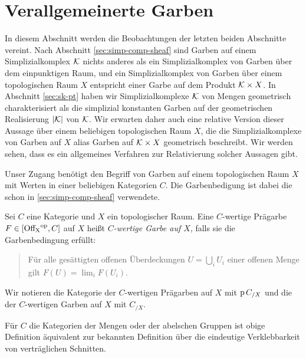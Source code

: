
\section{Verallgemeinerte Garben}
\label{sec:gen-sheaves}

In diesem Abschnitt werden die Beobachtungen der letzten beiden
Abschnitte vereint. Nach Abschnitt \autoref{sec:simp-comp-sheaf} sind
Garben auf einem Simplizialkomplex $\mathcal{K}$ nichts anderes als ein
Simplizialkomplex von Garben über dem einpunktigen Raum, und ein
Simplizialkomplex von Garben über einem topologischen Raum $X$
entspricht einer Garbe auf dem Produkt $\mathcal{K} \times X$. In Abschnitt
\autoref{sec:sk-pt} haben wir Simplizialkomplexe $\mathcal{K}$ von Mengen
geometrisch charakterisiert als die simplizial konstanten Garben auf
der geometrischen Realisierung $|\mathcal{K}|$ von $\mathcal{K}$. Wir erwarten daher
auch eine relative Version dieser Aussage über einem beliebigen
topologischen Raum $X$, die die Simplizialkomplexe von Garben auf $X$
alias Garben auf $\mathcal{K} \times X$ geometrisch beschreibt. Wir werden
sehen, dass es ein allgemeines Verfahren zur Relativierung solcher
Aussagen gibt.

Unser Zugang benötigt den Begriff von Garben auf einem topologischen
Raum $X$ mit Werten in einer beliebigen Kategorien $C$. Die
Garbenbedigung ist dabei die schon in \autoref{sec:simp-comp-sheaf}
verwendete.
\begin{defn}[\cite{TG}, 2.1.5]
  Sei $C$ eine Kategorie und $X$ ein topologischer Raum. Eine
  $C$-wertige Prägarbe $F \in [\operatorname{Off_X}^\mathrm{op}, C]$ auf $X$ heißt
  \emph{$C$-wertige Garbe auf $X$}, falls sie die Garbenbedingung
  erfüllt:
  \begin{quote}
    Für alle gesättigten offenen Überdeckungen $U = \bigcup_i U_i$
    einer offenen Menge gilt $F(U) = \lim_i F(U_i)$.
  \end{quote}
\end{defn}
Wir notieren die Kategorie der $C$-wertigen Prägarben auf $X$ mit $\operatorname{p}
C_{/X}$ und die der $C$-wertigen Garben auf $X$ mit $C_{/X}$.

Für $C$ die Kategorien der Mengen oder der abelschen Gruppen ist obige
Definition äquivalent zur bekannten Definition über die eindeutige
Verklebbarkeit von verträglichen Schnitten.

